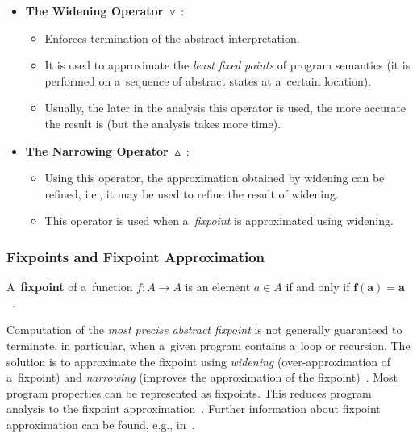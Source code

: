 \begin{itemize}
    \item
        \textbf{The Widening
        Operator~$ \triangledown $}~\cite{programAnalysisNielson,
        wideningNarrowingCousot, savAI}:

        \begin{itemize}
            \item
                Enforces termination of the abstract interpretation.

            \item
                It is used to approximate the \emph{least fixed points}
                of program semantics (it is performed on a~sequence of
                abstract states at a~certain location).

            \item
                Usually, the later in the analysis this operator is used,
                the more accurate the result is (but the analysis takes more
                time).
        \end{itemize}

    \item
        \textbf{The Narrowing
        Operator~$ \vartriangle $}~\cite{programAnalysisNielson,
        wideningNarrowingCousot, savAI}:

        \begin{itemize}
            \item
                Using this operator, the approximation obtained by
                widening can be refined, i.e., it may be used to refine the
                result of widening.

            \item
                This operator is used when a~\emph{fixpoint} is
                approximated using widening.
        \end{itemize}
\end{itemize}

\subsubsection{Fixpoints and Fixpoint Approximation}

A~\textbf{fixpoint} of a~function  $ f : A \rightarrow A $ is an
element $ a \in A $ if and only if
$ \boldsymbol{f(a) = a} $~\cite{harmimBP}.

Computation of the \emph{most precise abstract fixpoint} is not generally
guaranteed to terminate, in particular, when a~given program contains
a~loop or recursion. The solution is to approximate the fixpoint using
\emph{widening} (over-approximation of a~fixpoint) and \emph{narrowing}
(improves the approximation of the fixpoint)~\cite{savAI,
harmimBP}. Most program properties can be represented as
fixpoints. This reduces program analysis to the fixpoint
approximation~\cite{AICousotWeb}. Further information about fixpoint
approximation can be found, e.g., in~\cite{programAnalysisNielson,
wideningNarrowingCousot}.

